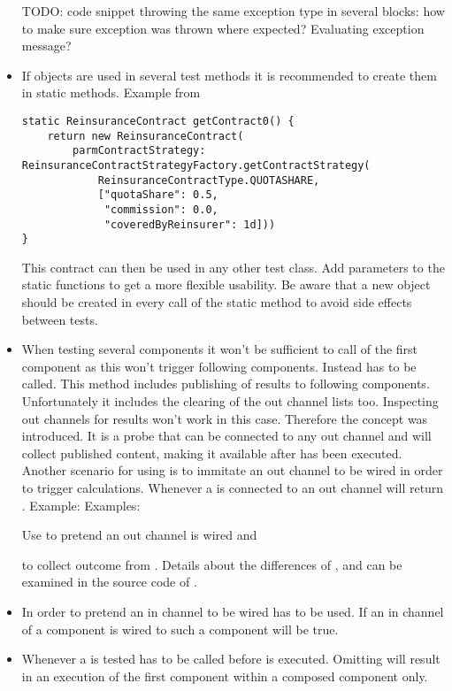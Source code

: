\begin{itemize}
	TODO: code snippet throwing the same exception type in several blocks: how to make sure exception was thrown where expected? Evaluating exception message?
	\item If objects are used in several test methods it is recommended to create them in static methods. Example from 
\begin{lstlisting}[label=lst:getcontract0]
static ReinsuranceContract getContract0() {
    return new ReinsuranceContract(
        parmContractStrategy: ReinsuranceContractStrategyFactory.getContractStrategy(
            ReinsuranceContractType.QUOTASHARE, 
            ["quotaShare": 0.5, 
             "commission": 0.0, 
             "coveredByReinsurer": 1d]))
}
\end{lstlisting}
  This contract can then be used in any other test class. Add parameters to the static functions to get a more flexible usability. Be aware that a new object should be created in every call of the static method to avoid side effects between tests.
  \item When testing several components it won't be sufficient to call  of the first component as this won't trigger following components. Instead  has to be called. This method includes publishing of results to following components. Unfortunately it includes the clearing of the out channel lists too. Inspecting out channels for results won't work in this case. Therefore the  concept was introduced. It is a probe that can be connected to any out channel and will collect published content, making it available after  has been executed. Another scenario for using  is to immitate an out channel to be wired in order to trigger calculations. Whenever a  is connected to an out channel  will return . Example: 
  Examples:
  
  Use  to pretend an out channel is wired and
  
   to collect outcome from . Details about the differences of ,  and  can be examined in the source code of .
  \item In order to pretend an in channel to be wired  has to be used. If an in channel of a component is wired to such a component  will be true.
  \item Whenever a  is tested  has to be called before  is executed. Omitting  will result in an execution of the first component within a composed component only.
\end{itemize}
 
